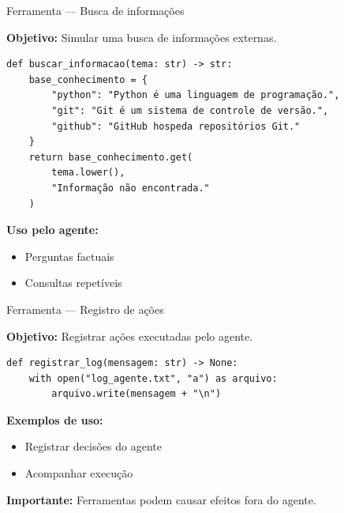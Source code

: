 \documentclass{beamer}
\begin{document}
\begin{frame}[fragile]{Ferramenta — Busca de informações}
    
    \textbf{Objetivo:}  
    Simular uma busca de informações externas.
    
    \begin{verbatim}
def buscar_informacao(tema: str) -> str:
    base_conhecimento = {
        "python": "Python é uma linguagem de programação.",
        "git": "Git é um sistema de controle de versão.",
        "github": "GitHub hospeda repositórios Git."
    }
    return base_conhecimento.get(
        tema.lower(),
        "Informação não encontrada."
    )
    \end{verbatim}
    
    \vspace{0.3cm}
    
    \textbf{Uso pelo agente:}
    \begin{itemize}
        \item Perguntas factuais
        \item Consultas repetíveis
    \end{itemize}
    
\end{frame}

\begin{frame}[fragile]{Ferramenta — Registro de ações}
    
    \textbf{Objetivo:}  
    Registrar ações executadas pelo agente.
    
    \begin{verbatim}
def registrar_log(mensagem: str) -> None:
    with open("log_agente.txt", "a") as arquivo:
        arquivo.write(mensagem + "\n")
    \end{verbatim}
    
    \vspace{0.3cm}
    
    \textbf{Exemplos de uso:}
    \begin{itemize}
        \item Registrar decisões do agente
        \item Acompanhar execução
    \end{itemize}
    
    \vspace{0.3cm}
    
    \textbf{Importante:}  
    Ferramentas podem causar efeitos fora do agente.
    
\end{frame}
\end{document}
